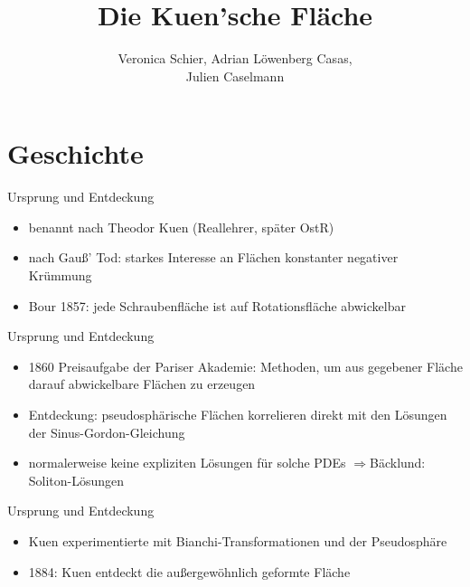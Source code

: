 \documentclass[12pt]{beamer}
\author{Veronica Schier, Adrian Löwenberg Casas, \\Julien Caselmann}
\title{Die Kuen'sche Fläche}
\begin{document}
\begin{frame}
\titlepage
\end{frame}

\begin{frame}

\tableofcontents

\end{frame}

\section{Geschichte}
\begin{frame}{Ursprung und Entdeckung}

\begin{itemize}
\item benannt nach Theodor Kuen (Reallehrer, später OstR)
\item nach Gauß' Tod: starkes Interesse an Flächen konstanter negativer Krümmung
\item Bour 1857: jede Schraubenfläche ist auf Rotationsfläche abwickelbar
\end{itemize}

\end{frame}

\begin{frame}{Ursprung und Entdeckung}

\begin{itemize}
\item 1860 Preisaufgabe der Pariser Akademie: Methoden, um aus gegebener Fläche darauf abwickelbare Flächen zu erzeugen\cite{scriba}
\item Entdeckung: pseudosphärische Flächen korrelieren direkt mit den Lösungen der Sinus-Gordon-Gleichung 
\item normalerweise keine expliziten Lösungen für solche PDEs $\Rightarrow$Bäcklund: Soliton-Lösungen \cite{bruter}
\end{itemize}

\end{frame}

\begin{frame}{Ursprung und Entdeckung}
\begin{itemize}

\item Kuen experimentierte mit Bianchi-Transformationen und der Pseudosphäre
\item 1884: Kuen entdeckt die außergewöhnlich geformte Fläche
\end{itemize}
\end{frame}
\end{document}
